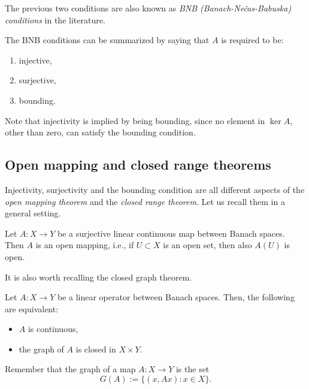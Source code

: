 The previous two conditions are also known as \emph{BNB (Banach-Ne\v{c}as-Babuska) conditions} in the literature.
\begin{remark}\label{rmk:bnb_conditions}
	The BNB conditions can be summarized by saying that $A$ is required to be:
	\begin{enumerate}
		\item injective,
		\item surjective,
		\item bounding.
	\end{enumerate}
	Note that injectivity is implied by being bounding, since no element in $\ker A$, other than zero, can satisfy the bounding condition.
\end{remark}


\subsection{Open mapping and closed range theorems}

Injectivity, surjectivity and the bounding condition are all different aspects of the \emph{open mapping theorem} and the \emph{closed range theorem}. Let us recall them in a general setting.

\begin{theorem}\label{thm:open_mapping}
	Let $A: X \to Y$ be a surjective linear continuous map between Banach spaces. Then $A$ is an open mapping, i.e., if $U \subset X$ is an open set, then also $A(U)$ is open.
\end{theorem}

It is also worth recalling the closed graph theorem.
\begin{theorem}\label{thm:closed_graph}
	Let $A: X \to Y$ be a linear operator between Banach spaces. Then, the following are equivalent:
	\begin{itemize}
		\item $A$ is continuous,
		\item the graph of $A$ is closed in $X \times Y$.
	\end{itemize}
\end{theorem}
Remember that the graph of a map $A: X \to Y$ is the set
\[
G(A) := \{(x,Ax) : x \in X\}.
\]


